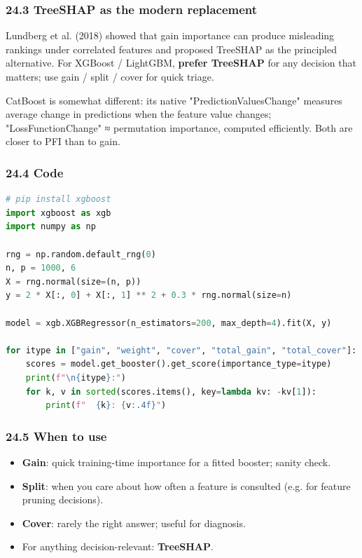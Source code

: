 \documentclass{article}
\providecommand{\tightlist}{\setlength{\itemsep}{0pt}\setlength{\parskip}{0pt}}
\begin{document}
\subsubsection{24.3 TreeSHAP as the modern
replacement}\label{243-treeshap-as-the-modern-replacement}

Lundberg et al. (2018) showed that gain importance can produce
misleading rankings under correlated features and proposed TreeSHAP as
the principled alternative. For XGBoost / LightGBM, \textbf{prefer
TreeSHAP} for any decision that matters; use gain / split / cover for
quick triage.

CatBoost is somewhat different: its native "PredictionValuesChange"
measures average change in predictions when the feature value changes;
"LossFunctionChange" ≈ permutation importance, computed efficiently.
Both are closer to PFI than to gain.

\subsubsection{24.4 Code}\label{244-code}

\begin{lstlisting}[language=Python]
# pip install xgboost
import xgboost as xgb
import numpy as np

rng = np.random.default_rng(0)
n, p = 1000, 6
X = rng.normal(size=(n, p))
y = 2 * X[:, 0] + X[:, 1] ** 2 + 0.3 * rng.normal(size=n)

model = xgb.XGBRegressor(n_estimators=200, max_depth=4).fit(X, y)

for itype in ["gain", "weight", "cover", "total_gain", "total_cover"]:
    scores = model.get_booster().get_score(importance_type=itype)
    print(f"\n{itype}:")
    for k, v in sorted(scores.items(), key=lambda kv: -kv[1]):
        print(f"  {k}: {v:.4f}")
\end{lstlisting}

\subsubsection{24.5 When to use}\label{245-when-to-use}

\begin{itemize}
\tightlist
\item
  \textbf{Gain}: quick training-time importance for a fitted booster;
  sanity check.
\item
  \textbf{Split}: when you care about how often a feature is consulted
  (e.g. for feature pruning decisions).
\item
  \textbf{Cover}: rarely the right answer; useful for diagnosis.
\item
  For anything decision-relevant: \textbf{TreeSHAP}.
\end{itemize}
\end{document}
